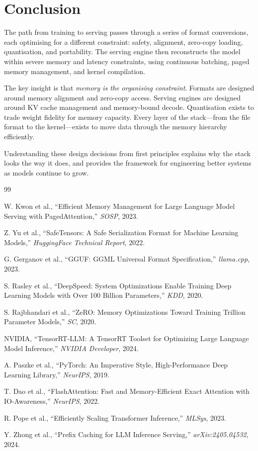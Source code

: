 \documentclass[11pt,a4paper]{article}
\theoremstyle{definition}
\begin{document}
\section{Conclusion}
\label{sec:conclusion}

The path from training to serving passes through a series of format conversions, each optimising for a different constraint: safety, alignment, zero-copy loading, quantisation, and portability. The serving engine then reconstructs the model within severe memory and latency constraints, using continuous batching, paged memory management, and kernel compilation.

The key insight is that \emph{memory is the organising constraint}. Formats are designed around memory alignment and zero-copy access. Serving engines are designed around KV cache management and memory-bound decode. Quantisation exists to trade weight fidelity for memory capacity. Every layer of the stack---from the file format to the kernel---exists to move data through the memory hierarchy efficiently.

Understanding these design decisions from first principles explains why the stack looks the way it does, and provides the framework for engineering better systems as models continue to grow.

\newpage
\begin{thebibliography}{99}

	 W. Kwon et al., ``Efficient Memory Management for Large Language Model Serving with PagedAttention,'' \emph{SOSP}, 2023.

	 Z. Yu et al., ``SafeTensors: A Safe Serialization Format for Machine Learning Models,'' \emph{HuggingFace Technical Report}, 2022.

	 G. Gerganov et al., ``GGUF: GGML Universal Format Specification,'' \emph{llama.cpp}, 2023.

	 S. Rasley et al., ``DeepSpeed: System Optimizations Enable Training Deep Learning Models with Over 100 Billion Parameters,'' \emph{KDD}, 2020.

	 S. Rajbhandari et al., ``ZeRO: Memory Optimizations Toward Training Trillion Parameter Models,'' \emph{SC}, 2020.

	 NVIDIA, ``TensorRT-LLM: A TensorRT Toolset for Optimizing Large Language Model Inference,'' \emph{NVIDIA Developer}, 2024.

	 A. Paszke et al., ``PyTorch: An Imperative Style, High-Performance Deep Learning Library,'' \emph{NeurIPS}, 2019.

	 T. Dao et al., ``FlashAttention: Fast and Memory-Efficient Exact Attention with IO-Awareness,'' \emph{NeurIPS}, 2022.

	 R. Pope et al., ``Efficiently Scaling Transformer Inference,'' \emph{MLSys}, 2023.

	 Y. Zhong et al., ``Prefix Caching for LLM Inference Serving,'' \emph{arXiv:2405.04532}, 2024.

\end{thebibliography}
\end{document}

